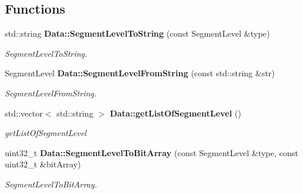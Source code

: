 \subsection*{Functions}
\begin{DoxyCompactItemize}
\item 
std\+::string \textbf{ Data\+::\+Segment\+Level\+To\+String} (const Segment\+Level \&type)
\begin{DoxyCompactList}\small\item\em Segment\+Level\+To\+String. \end{DoxyCompactList}\item 
Segment\+Level \textbf{ Data\+::\+Segment\+Level\+From\+String} (const std\+::string \&str)
\begin{DoxyCompactList}\small\item\em Segment\+Level\+From\+String. \end{DoxyCompactList}\item 
std\+::vector$<$ std\+::string $>$ \textbf{ Data\+::get\+List\+Of\+Segment\+Level} ()
\begin{DoxyCompactList}\small\item\em get\+List\+Of\+Segment\+Level \end{DoxyCompactList}\item 
uint32\+\_\+t \textbf{ Data\+::\+Segment\+Level\+To\+Bit\+Array} (const Segment\+Level \&type, const uint32\+\_\+t \&bit\+Array)
\begin{DoxyCompactList}\small\item\em Segment\+Level\+To\+Bit\+Array. \end{DoxyCompactList}\end{DoxyCompactItemize}
